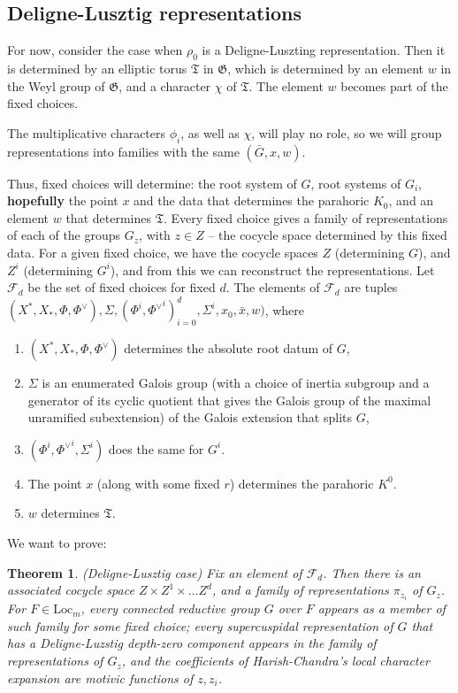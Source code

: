 \documentclass[12pt]{amsart}
\newcommand{\cF}{\mathcal{F}}
\newcommand{\Loc}{\mathrm{Loc}}
\def\cF{\mathcal{F}}
\newcommand{\fG}{\mathfrak G}
\newcommand{\fT}{\mathfrak T}
\theoremstyle{plain}
\newtheorem{theorem}[thm]{Theorem}
\theoremstyle{definition}
\begin{document}
  
\subsection{Deligne-Lusztig representations} 
For now, consider the case when $\rho_0$ is a Deligne-Luszting representation. 
Then it is determined by an elliptic torus $\fT$ in $\fG$, which is determined by an element $w$ in the Weyl group of $\fG$, and a character $\chi$ of $\fT$.  
The element $w$ becomes  part of the fixed choices.
  
The multiplicative characters $\phi_i$, as well as $\chi$, will play no role, so we will group representations into 
families with the same $(\bar G, x, w)$. 

Thus, fixed choices will determine: the root system of $G$, root systems of $G_i$, {\bf{hopefully}} the point $x$ and the data that determines the parahoric $K_0$, and an element $w$ that determines 
$\fT$.  
Every fixed choice gives a family of representations of each of the groups $G_z$, with $z\in Z$ -- the cocycle space determined by this fixed data.
For a given fixed choice, we have the cocycle spaces $Z$ (determining $G$), and $Z^i$ (determining $G^i$), and from this we can reconstruct the representations. 
Let $\cF_d$ be the set of fixed choices for fixed $d$.
The elements of $\cF_d$ are tuples 
$(X^\ast, X_\ast, \Phi, \Phi^\vee), \Sigma, (\Phi^i, {\Phi^\vee}^i)_{i=0}^d, \Sigma^i, x_0, \bar x, w)$, where 
\begin{enumerate}
\item  $(X^\ast, X_\ast, \Phi, \Phi^\vee)$  determines the absolute root datum of $G$, 
\item $\Sigma$ is an enumerated Galois group (with a choice of inertia subgroup and a 
generator of its cyclic quotient that gives the Galois group of the maximal unramified 
subextension) of the Galois extension that splits $G$,
\item  $(\Phi^i, {\Phi^\vee}^i, \Sigma^i)$ does the same for $G^i$. 
\item  The point $x$ (along with some fixed $r$) determines the parahoric $K^0$.   
\item $w$ determines  $\fT$. 
\end{enumerate}

We want to prove: 
\begin{theorem} (Deligne-Lusztig case) Fix an element of $\cF_d$. 
Then there is an associated cocycle space $Z\times Z^1\times \dots Z^d$, and a family of representations $\pi_{z_i}$ of $G_z$. 
For $F\in \Loc_m$, every connected reductive group $G$ over $F$ appears as a member  of such  family for some fixed choice; 
every supercuspidal representation of $G$ that has a Deligne-Luzstig depth-zero component 
appears in the family of representations of $G_z$, and 
the coefficients of Harish-Chandra's local character expansion are motivic functions of 
$z, z_i$. 
\end{theorem}
\end{document}
